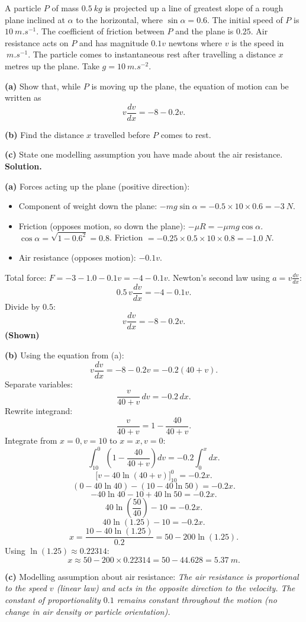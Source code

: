 \documentclass[11pt]{article}
\begin{document}
\begin{exoresolu}
A particle $P$ of mass $\SI{0.5}{kg}$ is projected up a line of greatest slope of a rough plane inclined at $\alpha$ to the horizontal, where $\sin\alpha=0.6$. The initial speed of $P$ is $\SI{10}{m.s^{-1}}$. The coefficient of friction between $P$ and the plane is $0.25$. Air resistance acts on $P$ and has magnitude $0.1v$ newtons where $v$ is the speed in $\SI{}{m.s^{-1}}$. The particle comes to instantaneous rest after travelling a distance $x$ metres up the plane. Take $g=\SI{10}{m.s^{-2}}$.

\textbf{(a)} Show that, while $P$ is moving up the plane, the equation of motion can be written as
\[
v\frac{dv}{dx} = -8 - 0.2v.
\]

\textbf{(b)} Find the distance $x$ travelled before $P$ comes to rest.

\textbf{(c)} State one modelling assumption you have made about the air resistance.
\tcblower
\textbf{Solution.}

\textbf{(a)} Forces acting up the plane (positive direction):
\begin{itemize}
\item Component of weight down the plane: $-mg\sin\alpha = -0.5\times10\times0.6 = -\SI{3}{N}$.
\item Friction (opposes motion, so down the plane): $-\mu R = -\mu mg\cos\alpha$. $\cos\alpha=\sqrt{1-0.6^2}=0.8$. Friction $= -0.25\times0.5\times10\times0.8 = -\SI{1.0}{N}$.
\item Air resistance (opposes motion): $-0.1v$.
\end{itemize}
Total force: $F = -3 - 1.0 - 0.1v = -4 - 0.1v$.
Newton's second law using $a=v\frac{dv}{dx}$:
\[
0.5\,v\frac{dv}{dx} = -4 - 0.1v.
\]
Divide by $0.5$:
\[
v\frac{dv}{dx} = -8 - 0.2v.
\]
\textbf{(Shown)}

\textbf{(b)} Using the equation from (a):
\[
v\frac{dv}{dx} = -8 - 0.2v = -0.2(40 + v).
\]
Separate variables:
\[
\frac{v}{40+v}\,dv = -0.2\,dx.
\]
Rewrite integrand:
\[
\frac{v}{40+v} = 1 - \frac{40}{40+v}.
\]
Integrate from $x=0, v=10$ to $x=x, v=0$:
\[
\int_{10}^0 \left(1 - \frac{40}{40+v}\right)dv = -0.2\int_0^x dx.
\]
\[
\Big[ v - 40\ln(40+v) \Big]_{10}^0 = -0.2x.
\]
\[
(0 - 40\ln40) - (10 - 40\ln50) = -0.2x.
\]
\[
-40\ln40 - 10 + 40\ln50 = -0.2x.
\]
\[
40\ln\left(\frac{50}{40}\right) - 10 = -0.2x.
\]
\[
40\ln(1.25) - 10 = -0.2x.
\]
\[
x = \frac{10 - 40\ln(1.25)}{0.2} = 50 - 200\ln(1.25).
\]
Using $\ln(1.25)\approx0.22314$:
\[
x \approx 50 - 200\times0.22314 = 50 - 44.628 = \SI{5.37}{m}.
\]

\textbf{(c)} Modelling assumption about air resistance: \emph{The air resistance is proportional to the speed $v$ (linear law) and acts in the opposite direction to the velocity. The constant of proportionality $0.1$ remains constant throughout the motion (no change in air density or particle orientation).}
\end{exoresolu}
\end{document}
